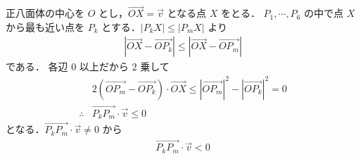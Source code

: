 \documentclass[../../main.tex]{subfiles}
\begin{document}
正八面体の中心を $O$ とし，$\overrightarrow{OX} = \vec{v}$ となる点 $X$ をとる．
$P_1, \cdots, P_6$ の中で点 $X$ から最も近い点を $P_k$ とする．$|P_k X| \le |P_m X|$ より
\begin{align}
  |\overrightarrow{OX} - \overrightarrow{OP_k}| \le |\overrightarrow{OX} - \overrightarrow{OP_m}|
\end{align}
である．
各辺 $0$ 以上だから $2$ 乗して
\begin{align}
  & 2 (\overrightarrow{OP_m} - \overrightarrow{OP_k}) \cdot \overrightarrow{OX} \le |\overrightarrow{OP_m}|^2 - |\overrightarrow{OP_k}|^2 = 0 \\
  \therefore
  & \overrightarrow{P_k P_m} \cdot \vec{v} \le 0
\end{align}
となる．$\overrightarrow{P_k P_m} \cdot \vec{v} \neq 0$ から
\begin{align}
  \overrightarrow{P_k P_m} \cdot \vec{v} < 0
\end{align}
\end{document}
